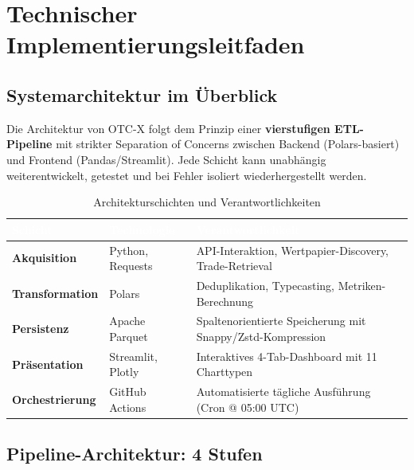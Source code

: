 \documentclass[12pt, a4paper, oneside]{report}
\begin{document}
\chapter{Technischer Implementierungsleitfaden}
\label{ch:implementation}

\section{Systemarchitektur im \"Uberblick}

Die Architektur von OTC-X folgt dem Prinzip einer \textbf{vierstufigen ETL-Pipeline} mit strikter Separation of Concerns zwischen Backend (Polars-basiert) und Frontend (Pandas/Streamlit). Jede Schicht kann unabh\"angig weiterentwickelt, getestet und bei Fehler isoliert wiederhergestellt werden.

\begin{table}[H]
\centering
\caption{Architekturschichten und Verantwortlichkeiten}
\label{tab:architecture}
\begin{tabularx}{\textwidth}{>{\bfseries\sffamily}l l X}
  \toprule
  \rowcolor{darknavy} \textcolor{white}{Schicht} & \textcolor{white}{Technologie} & \textcolor{white}{Verantwortlichkeit} \\
  \midrule
  Akquisition     & Python, Requests  & API-Interaktion, Wertpapier-Discovery, Trade-Retrieval \\
  Transformation  & Polars            & Deduplikation, Typecasting, Metriken-Berechnung \\
  Persistenz      & Apache Parquet    & Spaltenorientierte Speicherung mit Snappy/Zstd-Kompression \\
  Pr\"asentation  & Streamlit, Plotly & Interaktives 4-Tab-Dashboard mit 11 Charttypen \\
  Orchestrierung  & GitHub Actions    & Automatisierte t\"agliche Ausf\"uhrung (Cron @ 05:00 UTC) \\
  \bottomrule
\end{tabularx}
\end{table}

\section{Pipeline-Architektur: 4 Stufen}
\end{document}
